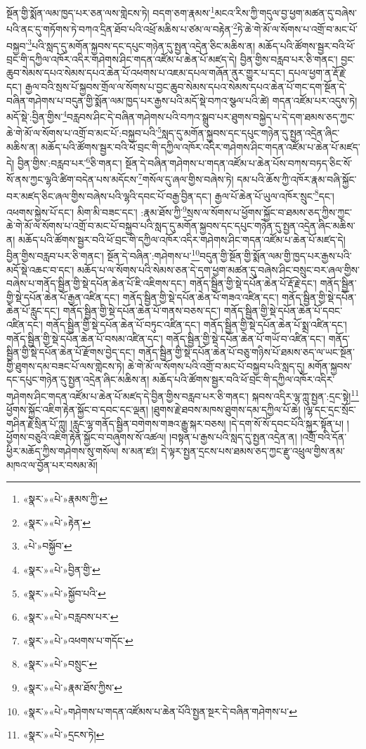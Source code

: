 སྔོན་གྱི་སྨོན་ལམ་ཁྱད་པར་ཅན་ལས་གླེངས་ཏེ། བདག་ཅག་རྣམས་\footnote{«སྣར་»«པེ་»རྣམས་ཀྱི་}མངའ་རིས་ཀྱི་གདུལ་བྱ་ཕྱག་མཚན་དུ་བཞེས་པའི་ནང་དུ་གཏོགས་ཏེ་བཀའ་དྲིན་ཐོབ་པའི་འཕྲོ་མཆིས་པ་ཙམ་ལ་བརྟེན་\footnote{«སྣར་»«པེ་»རྟེན་}ཏེ་ཆེ་གེ་མོ་ལ་སོགས་པ་འགྲོ་བ་མང་པོ་བསྐྱབ་\footnote{«པེ་»བསྐྱོབ་}པའི་སླད་དུ་མགོན་སྐྱབས་དང་དཔུང་གཉེན་དུ་སྤྱན་འདྲེན་ཅིང་མཆིས་ན། མཆོད་པའི་ཚོགས་སྦྱར་བའི་ཕོ་བྲང་གི་དཀྱིལ་འཁོར་འདིར་གཤེགས་ཤིང་གདན་འཛོམ་པ་ཆེན་པོ་མཛད་དེ། བྱིན་གྱིས་བརླབ་པར་ཅི་གནང་། བྱང་ཆུབ་སེམས་དཔའ་སེམས་དཔའ་ཆེན་པོ་འཕགས་པ་འཇམ་དཔལ་གཞོན་ནུར་གྱུར་པ་དང་། དཔལ་ཕྱག་ན་རྡོ་རྗེ་དང་། རྒྱལ་བའི་སྲས་པོ་སྐྱབས་གྲོལ་ལ་སོགས་པ་བྱང་ཆུབ་སེམས་དཔའ་སེམས་དཔའ་ཆེན་པོ་གང་དག་སྔོན་དེ་བཞིན་གཤེགས་པ་བདུན་གྱི་སྨོན་ལམ་ཁྱད་པར་རྒྱས་པའི་མདོ་སྡེ་བཀའ་སྩལ་པའི་ཚེ། གདན་འཛོམ་པར་འདུས་ཏེ། མདོ་སྡེ་:བྱིན་གྱིས་\footnote{«སྣར་»«པེ་»བྱིན་གྱི་}བརླབས་ཤིང་དེ་བཞིན་གཤེགས་པའི་བཀའ་སྒྲུབ་པར་ཐུགས་བསྐྱེད་པ་དེ་དག་ཐམས་ཅད་ཀྱང་ཆེ་གེ་མོ་ལ་སོགས་པ་འགྲོ་བ་མང་པོ་:བསྐྱབ་པའི་\footnote{«སྣར་»«པེ་»སྐྱོབ་པའི་}སླད་དུ་མགོན་སྐྱབས་དང་དཔུང་གཉེན་དུ་སྤྱན་འདྲེན་ཞིང་མཆིས་ན། མཆོད་པའི་ཚོགས་སྦྱར་བའི་ཕོ་བྲང་གི་དཀྱིལ་འཁོར་འདིར་གཤེགས་ཤིང་གདན་འཛོམ་པ་ཆེན་པོ་མཛད་དེ། བྱིན་གྱིས་:བརླབ་པར་\footnote{«སྣར་»«པེ་»བརླབས་པར་}ཅི་གནང་། སྔོན་དེ་བཞིན་གཤེགས་པ་གདན་འཛོམ་པ་ཆེན་པོས་བཀས་བཏད་ཅིང་སོ་སོ་ནས་ཀྱང་ལྷའི་ཚིག་བདེན་པས་མདོངས་\footnote{«སྣར་»«པེ་»འཕགས་པ་གདོང་}གསོལ་དུ་ཞལ་གྱིས་བཞེས་ཏེ། དམ་པའི་ཆོས་ཀྱི་འཁོར་རྣམ་བཞི་སྐྱོང་བར་མཛད་ཅིང་ཞལ་གྱིས་བཞེས་པའི་ལྷའི་དབང་པོ་བརྒྱ་བྱིན་དང་། རྒྱལ་པོ་ཆེན་པོ་ཡུལ་འཁོར་སྲུང་\footnote{«སྣར་»«པེ་»བསྲུང་}དང་། འཕགས་སྐྱེས་པོ་དང་། མིག་མི་བཟང་དང་། :རྣམ་ཐོས་ཀྱི་\footnote{«སྣར་»«པེ་»རྣམ་ཐོས་ཀྱིས་}སྲས་ལ་སོགས་པ་ཕྱོགས་སྐྱོང་བ་ཐམས་ཅད་ཀྱིས་ཀྱང་ཆེ་གེ་མོ་ལ་སོགས་པ་འགྲོ་བ་མང་པོ་བསྐྱབ་པའི་སླད་དུ་མགོན་སྐྱབས་དང་དཔུང་གཉེན་དུ་སྤྱན་འདྲེན་ཞིང་མཆིས་ན། མཆོད་པའི་ཚོགས་སྦྱར་བའི་ཕོ་བྲང་གི་དཀྱིལ་འཁོར་འདིར་གཤེགས་ཤིང་གདན་འཛོམ་པ་ཆེན་པོ་མཛད་དེ། བྱིན་གྱིས་བརླབ་པར་ཅི་གནང་། སྔོན་དེ་བཞིན་:གཤེགས་པ་\footnote{«སྣར་»«པེ་»གཤེགས་པ་གདན་འཛོམས་པ་ཆེན་པོའི་སྤྱན་སྔར་དེ་བཞིན་གཤེགས་པ་}བདུན་གྱི་སྔོན་གྱི་སྨོན་ལམ་གྱི་ཁྱད་པར་རྒྱས་པའི་མདོ་སྡེ་འཆང་བ་དང་། མཆོད་པ་ལ་སོགས་པའི་སེམས་ཅན་དེ་དག་ཕྱག་མཚན་དུ་བཞེས་ཤིང་བསྲུང་བར་ཞལ་གྱིས་བཞེས་པ་གནོད་སྦྱིན་གྱི་སྡེ་དཔོན་ཆེན་པོ་ཇི་འཇིགས་དང་། གནོད་སྦྱིན་གྱི་སྡེ་དཔོན་ཆེན་པོ་རྡོ་རྗེ་དང་། གནོད་སྦྱིན་གྱི་སྡེ་དཔོན་ཆེན་པོ་རྒྱན་འཛིན་དང་། གནོད་སྦྱིན་གྱི་སྡེ་དཔོན་ཆེན་པོ་གཟའ་འཛིན་དང་། གནོད་སྦྱིན་གྱི་སྡེ་དཔོན་ཆེན་པོ་རླུང་དང་། གནོད་སྦྱིན་གྱི་སྡེ་དཔོན་ཆེན་པོ་གནས་བཅས་དང་། གནོད་སྦྱིན་གྱི་སྡེ་དཔོན་ཆེན་པོ་དབང་འཛིན་དང་། གནོད་སྦྱིན་གྱི་སྡེ་དཔོན་ཆེན་པོ་བཏུང་འཛིན་དང་། གནོད་སྦྱིན་གྱི་སྡེ་དཔོན་ཆེན་པོ་སྨྲ་འཛིན་དང་། གནོད་སྦྱིན་གྱི་སྡེ་དཔོན་ཆེན་པོ་བསམ་འཛིན་དང་། གནོད་སྦྱིན་གྱི་སྡེ་དཔོན་ཆེན་པོ་གཡོ་བ་འཛིན་དང་། གནོད་སྦྱིན་གྱི་སྡེ་དཔོན་ཆེན་པོ་རྫོགས་བྱེད་དང་། གནོད་སྦྱིན་གྱི་སྡེ་དཔོན་ཆེན་པོ་བཅུ་གཉིས་པོ་ཐམས་ཅད་ལ་ཡང་སྔོན་གྱི་ཐུགས་དམ་བཟང་པོ་ལས་གླེངས་ཏེ། ཆེ་གེ་མོ་ལ་སོགས་པའི་འགྲོ་བ་མང་པོ་བསྐྱབ་པའི་སླད་དུ། མགོན་སྐྱབས་དང་དཔུང་གཉེན་དུ་སྤྱན་འདྲེན་ཞིང་མཆིས་ན། མཆོད་པའི་ཚོགས་སྦྱར་བའི་ཕོ་བྲང་གི་དཀྱིལ་འཁོར་འདིར་གཤེགས་ཤིང་གདན་འཛོམ་པ་ཆེན་པོ་མཛད་དེ་བྱིན་གྱིས་བརླབ་པར་ཅི་གནང་། སྐབས་འདིར་ལྷ་ཀླུ་སྤྱན་:དྲང་སྟེ།\footnote{«སྣར་»«པེ་»དྲངས་ཏེ།} ཕྱོགས་སྐྱོང་འཇིག་རྟེན་སྐྱོང་བ་དབང་དང་ལྡན། །ཐུགས་རྗེ་ཐབས་མཁས་ཐུགས་དམ་དཀྱིལ་པོ་ཆེ། །ལྷ་དང་དྲང་སྲོང་གཤིན་རྗེ་སྲིན་པོ་ཀླུ། །རླུང་ལྷ་གནོད་སྦྱིན་བགེགས་གཟའ་རྒྱུ་སྐར་བཅས། །དེ་དག་སོ་སོ་དབང་པོའི་སྐུར་སྟོན་པ། །ཕྱོགས་བཅུའི་འཇིག་རྟེན་སྐྱོང་བ་བཞུགས་སོ་འཚལ། །བསྟན་པ་རྒྱས་པའི་སླད་དུ་སྤྱན་འདྲེན་ན། །འགྲོ་བའི་དོན་ཕྱིར་མཆོད་ཀྱིས་གཤེགས་སུ་གསོལ། ས་མན་ཛཿ། དེ་ལྟར་སྤྱན་དྲངས་པས་ཐམས་ཅད་ཀྱང་རྫུ་འཕྲུལ་གྱིས་ནམ་མཁའ་ལ་བྱོན་པར་བསམ་མོ། 